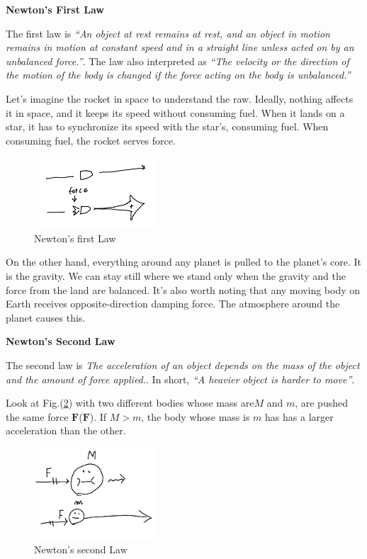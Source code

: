 \documentclass[pdflatex,sn-mathphys-num]{sn-jnl}%
\theoremstyle{thmstyleone}%
\theoremstyle{thmstyletwo}%
\theoremstyle{thmstylethree}%
\begin{document}
{\noindent\rm\bf\large Newton's First Law}

The first law is {\sl ``An object at rest remains at rest, and an object in motion remains in motion at constant speed and in a straight line unless acted on by an unbalanced force.''}. The law also interpreted as {\sl ``The velocity or the direction of the motion of the body is changed if the force acting on the body is unbalanced.''}

Let's imagine the rocket in space to understand the raw. Ideally, nothing affects it in space, and it keeps its speed without consuming fuel. When it lands on a star, it has to synchronize its speed with the star's, consuming fuel. When consuming fuel, the rocket serves force.

\begin{figure}[H]
	\centering
	\includegraphics[width=0.4\textwidth]{images/NewtonsFirstLaw.png}
	\caption{Newton's first Law}
	\label{NewF}
\end{figure}

On the other hand, everything around any planet is pulled to the planet's core. It is the gravity. We can stay still where we stand only when the gravity and the force from the land are balanced. It's also worth noting that any moving body on Earth receives opposite-direction damping force. The atmosphere around the planet causes this.\vspace{2truemm}

{\noindent\rm\bf\large Newton's Second Law}

The second law is {\sl The acceleration of an object depends on the mass of the object and the amount of force applied.}. In short, {\sl ``A heavier object is harder to move''}.

Look at Fig.(\ref{NewS}) with two different bodies whose mass are$M$ and $m$, are pushed the same force $\boldsymbol{F}$($\boldsymbol{F}$). If $M > m$, the body whose mass is $m$ has has a larger acceleration than the other.

\begin{figure}[H]
	\centering
	\includegraphics[width=0.4\textwidth]{images/NewtonsSecondLaw.png}
	\caption{Newton's second Law}
	\label{NewS}
\end{figure}
\end{document}

